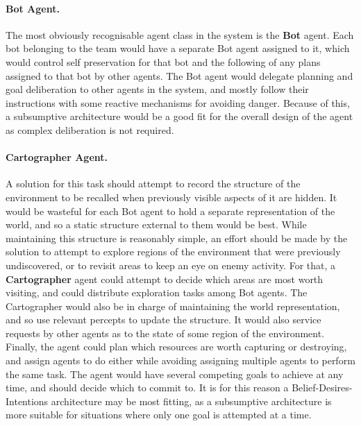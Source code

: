 \documentclass[a4paper,10pt]{article}
\begin{document}
\paragraph{Bot Agent.}
The most obviously recognisable agent class in the system is the \textbf{Bot} agent. Each bot belonging to the team would have a separate Bot agent assigned to it, which would control self preservation for that bot and the following of any plans assigned to that bot by other agents. The Bot agent would delegate planning and goal deliberation to other agents in the system, and mostly follow their instructions with some reactive mechanisms for avoiding danger. Because of this, a subsumptive architecture\cite{brooks90} would be a good fit for the overall design of the agent as complex deliberation is not required.

\paragraph{Cartographer Agent.}
A solution for this task should attempt to record the structure of the environment to be recalled when previously visible aspects of it are hidden. It would be wasteful for each Bot agent to hold a separate representation of the world, and so a static structure external to them would be best. While maintaining this structure is reasonably simple, an effort should be made by the solution to attempt to explore regions of the environment that were previously undiscovered, or to revisit areas to keep an eye on enemy activity. For that, a \textbf{Cartographer} agent could attempt to decide which areas are most worth visiting, and could distribute exploration tasks among Bot agents. The Cartographer would also be in charge of maintaining the world representation, and so use relevant percepts to update the structure. It would also service requests by other agents as to the state of some region of the environment. Finally, the agent could plan which resources are worth capturing or destroying, and assign agents to do either while avoiding assigning multiple agents to perform the same task. The agent would have several competing goals to achieve at any time, and should decide which to commit to. It is for this reason a Belief-Desires-Intentions\cite{rao95} architecture may be most fitting, as a subsumptive architecture is more suitable for situations where only one goal is attempted at a time.
\end{document}
